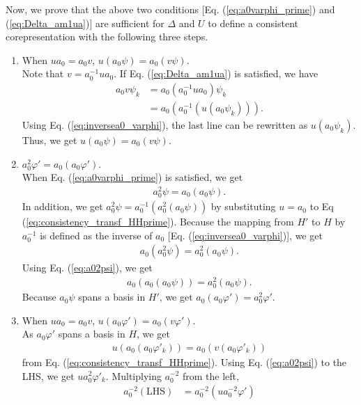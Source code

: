 \documentclass{article}
\begin{document}
Now, we prove that the above two conditions [Eq. (\ref{eq:a0varphi_prime}) and (\ref{eq:Delta_am1ua})] are sufficient for $\Delta$ and $U$ to define a consistent corepresentation with the following three steps.
\begin{enumerate}
  \item When $u a_0 = a_0 v$, $u (a_0 \psi) = a_0 (v \psi)$.\\
  Note that $v = a_0^{-1} u a_0$. If Eq. (\ref{eq:Delta_am1ua}) is satisfied, we have
  \begin{align}
    a_0 v \psi_k 
    &= 
    a_0 (a_0^{-1} u a_0)\psi_k
    \nonumber
    \\&=
    a_0 (a_0^{-1} (u (a_0\psi_k))).
  \end{align}
  Using Eq. (\ref{eq:inversea0_varphi}), the last line can be rewritten as $u (a_0\psi_k)$. Thus, we get $u (a_0 \psi) = a_0 (v \psi)$.
  \item $a_0^2 \varphi' = a_0 (a_0 \varphi')$.\\
  When Eq. (\ref{eq:a0varphi_prime}) is satisfied, we get 
  \begin{align}
    a_0^2 \psi = a_0 (a_0 \psi).
    \label{eq:a02psi}
  \end{align} 
  In addition, we get $a_0^2 \psi = a_0^{-1} (a_0^2 (a_0 \psi))$ by substituting $u=a_0$ to Eq (\ref{eq:consistency_transf_HHprime}). Because the mapping from $H'$ to $H$ by $a_0^{-1}$ is defined as the inverse of $a_0$ [Eq. (\ref{eq:inversea0_varphi})], we get 
  \begin{align}
    a_0(a_0^2 \psi) =  a_0^2 (a_0 \psi).
  \end{align}
  Using Eq. (\ref{eq:a02psi}), we get 
  \begin{align}
    a_0(a_0(a_0 \psi)) =  a_0^2 (a_0 \psi).
  \end{align}
  Because $a_0 \psi$ spans a basis in $H'$, we get $a_0(a_0 \varphi') =  a_0^2 \varphi'$.
  \item When $u a_0 = a_0 v$, $u (a_0 \varphi') = a_0 (v \varphi')$.\\
  As $a_0 \varphi'$ spans a basis in $H$, we get
  \begin{align}
    u (a_0 (a_0 \varphi'_k)) = a_0 (v(a_0 \varphi'_k))
  \end{align}
  from Eq. (\ref{eq:consistency_transf_HHprime}). Using Eq. (\ref{eq:a02psi}) to the LHS, we get $u a_0^2 \varphi'_k$. Multiplying $a_0^{-2}$ from the left, 
  \begin{align}
    a_0^{-2} (\text{LHS}) &= a_0^{-2} (u a_0^{-2} \varphi')
    \nonumber

\end{align}
\end{enumerate}
\end{document}
